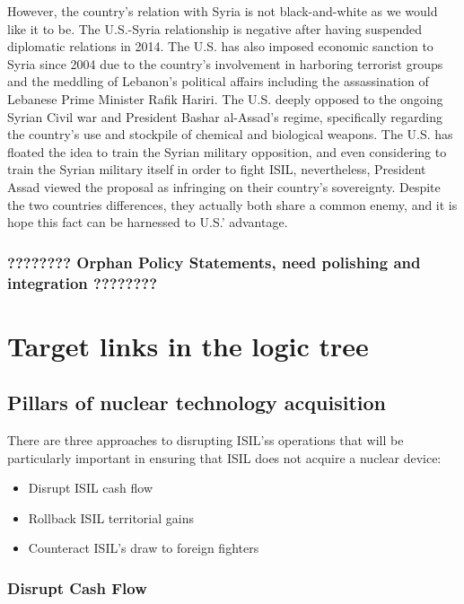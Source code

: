 \documentclass{report}
\begin{document}
However, the country's relation with Syria is not black-and-white as we would like it to be. The U.S.-Syria relationship is negative after having suspended diplomatic relations in 2014. The U.S. has also imposed economic sanction to Syria since 2004 due to the country's involvement in harboring terrorist groups and the meddling of Lebanon's political affairs including the assassination of Lebanese Prime Minister Rafik Hariri. The U.S. deeply opposed to the ongoing Syrian Civil war and President Bashar al-Assad's regime, specifically regarding the country's use and stockpile of chemical and biological weapons. The U.S. has floated the idea to train the Syrian military opposition, and even considering to train the Syrian military itself in order to fight ISIL, nevertheless, President Assad viewed the proposal as infringing on their country's sovereignty. Despite the two countries differences, they actually both share a common enemy, and it is hope this fact can be harnessed to U.S.' advantage.


\subsubsection{????????  Orphan Policy Statements, need polishing and integration ????????}


\section{Target links in the logic tree}

\subsection{Pillars of nuclear technology acquisition }

There are three approaches to disrupting ISIL'ss operations that will be particularly important in ensuring that ISIL does not acquire a nuclear device:

\begin{itemize}
  \item Disrupt ISIL cash flow
  \item Rollback ISIL territorial gains
  \item Counteract ISIL's draw to foreign fighters
\end{itemize}

\subsubsection{Disrupt Cash Flow}
\end{document}
